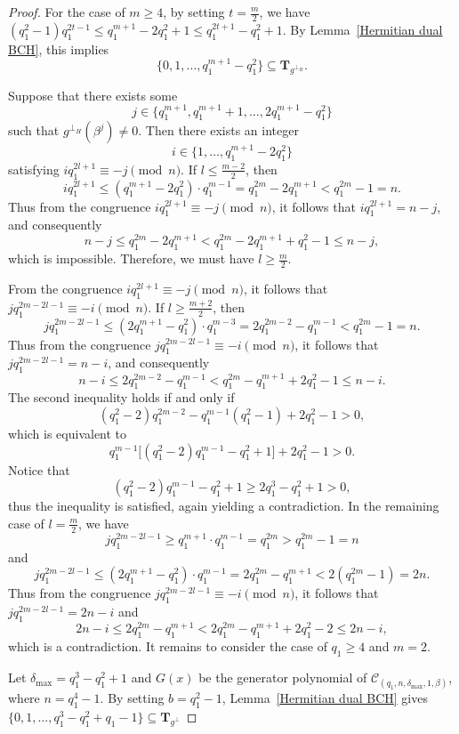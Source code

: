 \documentclass[journal,12pt,onecolumn]{IEEEtran}
\begin{document}
\begin{proof}
For the case of $m\ge 4$, by setting $t = \frac{m}{2}$, we have
\(
(q_1^2 - 1)q_1^{2t-1} \le q_1^{m+1} - 2q_1^2 + 1 \le q_1^{2t+1} - q_1^2 + 1
\). By Lemma~\ref{Hermitian dual BCH}, this implies
\[
\{0,1,\dots,q_1^{m+1} - q_1^2\} \subseteq \mathbf{T}_{g^{\perp_H}}.
\]

Suppose that there exists some
\[
j \in \{q_1^{m+1}, q_1^{m+1} + 1, \dots, 2q_1^{m+1} - q_1^2\}
\]
such that $g^{\perp_H}(\beta^j) \ne 0$. Then there exists an integer
\[
i \in \{1, \dots, q_1^{m+1} - 2q_1^2\}
\]
satisfying
\(
i q_1^{2l+1} \equiv -j \pmod{n}
\). If $l \le \frac{m-2}{2}$, then
\[
i q_1^{2l+1} \le (q_1^{m+1} - 2q_1^2) \cdot q_1^{m-1}
= q_1^{2m} - 2q_1^{m+1}
< q_1^{2m} - 1 = n.
\]
Thus from the congruence $i q_1^{2l+1} \equiv -j \pmod{n}$, it follows that $i q_1^{2l+1} = n - j$, and consequently
\[
n - j \le q_1^{2m} - 2q_1^{m+1}
< q_1^{2m} - 2q_1^{m+1} + q_1^2 - 1
\le n - j,
\]
which is impossible. Therefore, we must have $l \ge \frac{m}{2}$.

From the congruence $i q_1^{2l+1} \equiv -j \pmod{n}$, it follows that
\(
j q_1^{2m-2l-1} \equiv -i \pmod{n}
\). If $l \ge \frac{m+2}{2}$, then
\[
j q_1^{2m-2l-1} \le (2q_1^{m+1} - q_1^2) \cdot q_1^{m-3}
= 2q_1^{2m-2} - q_1^{m-1}
< q_1^{2m} - 1 = n.
\]
Thus from the congruence $j q_1^{2m-2l-1} \equiv -i \pmod{n}$, it follows that $j q_1^{2m-2l-1} = n - i$, and consequently
\[
n - i \le 2q_1^{2m-2} - q_1^{m-1}
< q_1^{2m} - q_1^{m+1} + 2q_1^2 - 1
\le n - i.
\]
The second inequality holds if and only if
\[
(q_1^2 - 2)q_1^{2m-2} - q_1^{m-1}(q_1^2 - 1) + 2q_1^2 - 1 > 0,
\]
which is equivalent to
\[
q_1^{m-1}\big[(q_1^2 - 2)q_1^{m-1} - q_1^2 + 1\big] + 2q_1^2 - 1 > 0.
\]
Notice that
\[
(q_1^2 - 2)q_1^{m-1} - q_1^2 + 1 \ge 2q_1^3 - q_1^2 + 1 > 0,
\]
thus the inequality is satisfied, again yielding a contradiction. In the remaining case of $l=\frac{m}{2}$, we have
\[
j q_1^{2m-2l-1} \ge q_1^{m+1} \cdot q_1^{m-1} = q_1^{2m} > q_1^{2m} - 1 = n
\]
and
\[
j q_1^{2m-2l-1} \le (2q_1^{m+1} - q_1^2) \cdot q_1^{m-1}
= 2q_1^{2m} - q_1^{m+1}
< 2(q_1^{2m} - 1) = 2n.
\]
Thus from the congruence $j q_1^{2m-2l-1} \equiv -i \pmod{n}$, it follows that $j q_1^{2m-2l-1} = 2n - i$ and
\[
2n - i \le 2q_1^{2m} - q_1^{m+1}
< 2q_1^{2m} - q_1^{m+1} + 2q_1^2 - 2
\le 2n - i,
\]
which is a contradiction. It remains to consider the case of $q_1\ge 4$ and $m = 2$.

Let $\delta_{\max} = q_1^3 - q_1^2 + 1$ and $G(x)$ be the generator polynomial of $\mathcal{C}_{(q_1, n, \delta_{\max}, 1, \beta)}$, where $n = q_1^4 - 1$. By setting $b=q_1^2-1$, Lemma~\ref{Hermitian dual BCH} gives $\{0,1,\dots,q_1^3 - q_1^2 + q_1 - 1\} \subseteq \mathbf{T}_{g^{\perp}}$


\end{proof}
\end{document}
